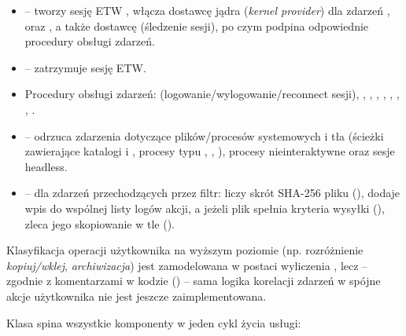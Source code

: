 \begin{itemize}[leftmargin=1.6em]
  \item {} -- tworzy sesję ETW ,
        włącza dostawcę jądra (\emph{kernel provider}) dla zdarzeń , 
        oraz , a także dostawcę  (śledzenie sesji), po czym
        podpina odpowiednie procedury obsługi zdarzeń.
  \item {} -- zatrzymuje sesję ETW.
  \item Procedury obsługi zdarzeń:  (logowanie/wylogowanie/reconnect sesji),
        , , , ,
        , , , .
  \item {} -- odrzuca zdarzenia dotyczące plików/procesów
        systemowych i tła (ścieżki zawierające katalogi  i , procesy typu
        , , ), procesy nieinteraktywne oraz sesje
        headless.
  \item {} -- dla zdarzeń przechodzących przez filtr: liczy skrót SHA-256 pliku
        (), dodaje wpis do wspólnej listy logów akcji, a jeżeli plik
        spełnia kryteria wysyłki (), zleca jego skopiowanie
        w tle ().
\end{itemize}

Klasyfikacja operacji użytkownika na wyższym poziomie (np. rozróżnienie \emph{kopiuj/wklej},
\emph{archiwizacja}) jest zamodelowana w postaci wyliczenia , lecz -- zgodnie
z komentarzami w kodzie () -- sama logika korelacji zdarzeń w spójne
akcje użytkownika nie jest jeszcze zaimplementowana.


Klasa  spina wszystkie komponenty w jeden cykl życia usługi:

